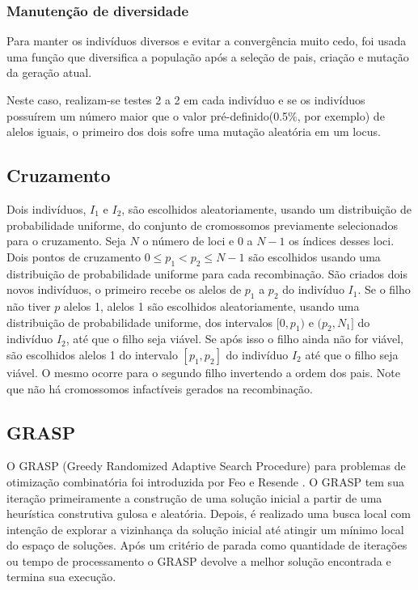 \documentclass[12pt,a4paper]{article}
\begin{document}
    \subsubsection{Manutenção de diversidade}

        Para manter os indivíduos diversos e evitar a convergência muito cedo, foi usada uma função que diversifica a população após a seleção de pais, criação e mutação da geração atual.

        Neste caso, realizam-se testes 2 a 2 em cada indivíduo e se os indivíduos possuírem um número maior que o valor pré-definido(0.5$\%$, por exemplo) de alelos iguais, o primeiro dos
        dois sofre uma mutação aleatória em um locus.

    \subsection{Cruzamento}

        Dois indivíduos, $I_1$ e $I_2$, são escolhidos aleatoriamente, usando um distribuição de probabilidade uniforme, do conjunto de cromossomos previamente selecionados para o cruzamento. Seja
        $N$ o número de loci e $0$ a $N-1$ os índices desses loci. Dois pontos de cruzamento $0 \le p_1 < p_2 \le N-1$ são escolhidos usando uma distribuição de probabilidade uniforme para cada
        recombinação. São criados dois novos indivíduos, o primeiro recebe os alelos de $p_1$ a $p_2$ do indivíduo $I_1$. Se o filho não tiver $p$ alelos 1, alelos 1 são escolhidos aleatoriamente,
        usando uma distribuição de probabilidade uniforme, dos intervalos $[0, p_1)$ e $(p_2, N_1]$ do indivíduo $I_2$, até que o filho seja viável. Se após isso o filho ainda não for viável, são
        escolhidos alelos 1 do intervalo $[p_1, p_2]$ do indivíduo $I_2$ até que o filho seja viável. O mesmo ocorre para o segundo filho invertendo a ordem dos pais. Note que não há cromossomos
        infactíveis gerados na recombinação. 

\subsection{GRASP}
    O GRASP (Greedy Randomized Adaptive Search Procedure) para problemas de otimização combinatória foi introduzida por Feo e Resende \cite{feo1989probabilistic}. O GRASP tem sua iteração
    primeiramente a construção de uma solução inicial a partir de uma heurística construtiva gulosa e aleatória. Depois, é realizado uma busca local com intenção de explorar a vizinhança da
    solução inicial até atingir um mínimo local do espaço de soluções. Após um critério de parada como quantidade de iterações ou tempo de processamento o GRASP devolve a melhor solução
    encontrada e termina sua execução.
\end{document}
